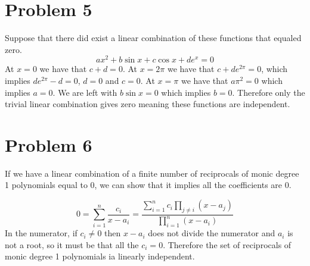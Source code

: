 \documentclass{article}
\begin{document}
\section*{Problem 5}
Suppose that there did exist a linear combination of these functions that equaled zero. 
\[
    ax^2+b\sin x + c\cos x + de^x = 0
\]
At $x=0$ we have that $c+d=0$.
At $x=2\pi$ we have that $c +de^{2\pi} = 0$, which implies $de^{2\pi} - d = 0$, $d=0$ and $c=0$.
At $x=\pi$ we have that $a\pi^2 = 0$ which implies $a=0$.
We are left with $b\sin x = 0$ which implies $b=0$.
Therefore only the trivial linear combination gives zero meaning these functions are independent.
\newpage

\section*{Problem 6}
If we have a linear combination of a finite number of reciprocals of monic degree 1 polynomials
equal to $0$, we can show that it implies all the coefficients are $0$.

\[
    0 = \sum_{i=1}^n \frac{c_i}{x-a_i} 
    = \frac{\sum_{i=1}^n c_i \prod_{j\neq i} (x-a_j)}{\prod_{i=1}^n (x-a_i)}
\]
In the numerator, if $c_i \neq 0$ then $x-a_i$ does not divide the numerator and 
$a_i$ is not a root, so it must be that all the $c_i = 0$.
Therefore the set of reciprocals of monic degree 1 polynomials ia linearly independent.
\end{document}

